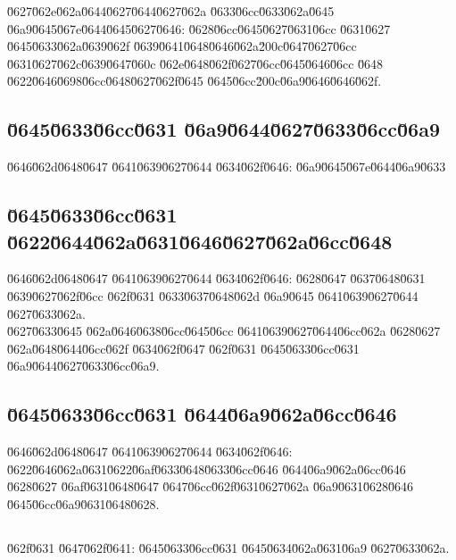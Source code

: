 \documentclass[12pt,a4paper]{article}
\begin{document}
\u0627\u062e\u062a\u0644\u0627\u0644\u0627\u062a \u0633\u06cc\u0633\u062a\u0645 \u06a9\u0645\u067e\u0644\u0645\u0627\u0646: \u0628\u06cc\u0645\u0627\u0631\u06cc \u0631\u0627 \u0645\u0633\u062a\u0639\u062f \u0639\u0641\u0648\u0646\u062a\u200c\u0647\u0627\u06cc \u0631\u0627\u062c\u0639\u0647\u060c \u062e\u0648\u062f\u0627\u06cc\u0645\u0646\u06cc \u0648 \u0622\u0646\u0698\u06cc\u0648\u0627\u062f\u0645 \u0645\u06cc\u200c\u06a9\u0646\u0646\u062f.

\subsection*{\u0645\u0633\u06cc\u0631 \u06a9\u0644\u0627\u0633\u06cc\u06a9}
\u0646\u062d\u0648\u0647 \u0641\u0639\u0627\u0644 \u0634\u062f\u0646: \u06a9\u0645\u067e\u0644\u06a9\u0633  \\

\subsection*{\u0645\u0633\u06cc\u0631 \u0622\u0644\u062a\u0631\u0646\u0627\u062a\u06cc\u0648}
\u0646\u062d\u0648\u0647 \u0641\u0639\u0627\u0644 \u0634\u062f\u0646: \u0628\u0647 \u0637\u0648\u0631 \u0639\u0627\u062f\u06cc \u062f\u0631 \u0633\u0637\u0648\u062d \u06a9\u0645 \u0641\u0639\u0627\u0644 \u0627\u0633\u062a. \\
\u0627\u0633\u0645 \u062a\u0646\u0638\u06cc\u0645\u06cc \u0641\u0639\u0627\u0644\u06cc\u062a \u0628\u0627  \u062a\u0648\u0644\u06cc\u062f \u0634\u062f\u0647 \u062f\u0631 \u0645\u0633\u06cc\u0631 \u06a9\u0644\u0627\u0633\u06cc\u06a9.

\subsection*{\u0645\u0633\u06cc\u0631 \u0644\u06a9\u062a\u06cc\u0646}
\u0646\u062d\u0648\u0647 \u0641\u0639\u0627\u0644 \u0634\u062f\u0646: \u0622\u0646\u062a\u0631\u0622\u06af\u0633\u0648\u0633\u06cc\u0646 \u0644\u06a9\u062a\u06cc\u0646 \u0628\u0627 \u06af\u0631\u0648\u0647 \u0647\u06cc\u062f\u0631\u0627\u062a \u06a9\u0631\u0628\u0646 \u0645\u06cc\u06a9\u0631\u0648\u0628.

\subsection*{}
\u062f\u0631 \u0647\u062f\u0641: \u0645\u0633\u06cc\u0631 \u0645\u0634\u062a\u0631\u06a9 \u0627\u0633\u062a.
\end{document}
